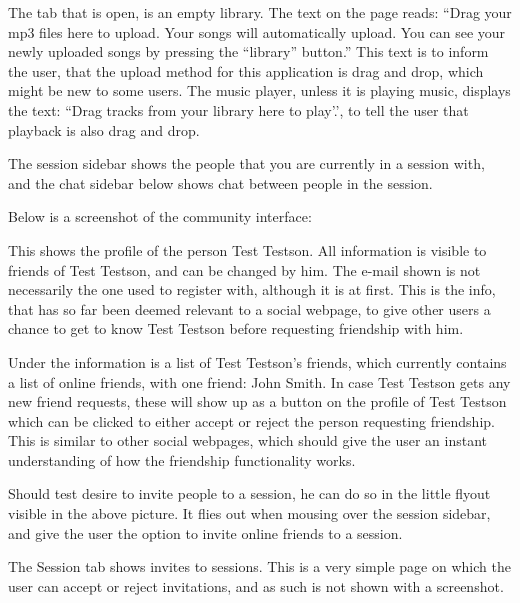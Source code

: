 \vspace{10pt}
The tab that is open, is an empty library. The text on the page reads: ``Drag your mp3 files here to upload. Your songs will
automatically upload. You can see your newly uploaded songs by pressing the ``library'' button.'' This text is to inform the
user, that the upload method for this application is drag and drop, which might be new to some users. The music player,
unless it is playing music, displays the text: ``Drag tracks from your library here to play'.', to tell the user that
playback is also drag and drop. 

\vspace{10pt}
The session sidebar shows the people that you are currently in a session with, and the chat sidebar below shows chat between
people in the session.

Below is a screenshot of the community interface:

\noindent{}
This shows the profile of the person Test Testson. All information is visible to friends of Test Testson, and can be changed
by him. The e-mail shown is not necessarily the one used to register with, although it is at first. This is the info, that has
so far been deemed relevant to a social webpage, to give other users a chance to get to know Test Testson before requesting
friendship with him. 

Under the information is a list of Test Testson's friends, which currently contains a list of online
friends, with one friend: John Smith. In case Test Testson gets any new friend requests, these will show up as a button on the profile of Test Testson which can be clicked to either accept or reject the person requesting friendship. This is similar to
other social webpages, which should give the user an instant understanding of how the friendship functionality works. 

\vspace{10pt}
Should test desire to invite people to a session, he can do so in the little flyout visible in the above picture. It flies out when mousing over the session sidebar, and give the user the option to invite online friends to a session.

\vspace{10pt}
The Session tab shows invites to sessions. This is a very simple page on which the user can accept or reject invitations, and as such is not shown with a screenshot. 